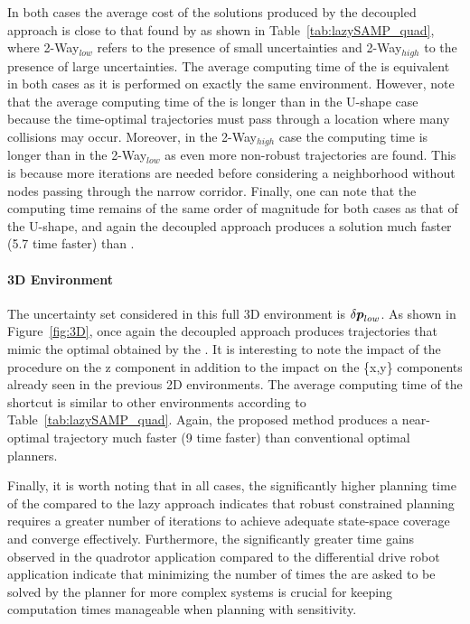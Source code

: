 In both cases the average cost of the solutions produced by the decoupled approach is close to that found by  as shown in Table~\ref{tab:lazySAMP_quad}, where 2-Way$_{low}$ refers to the presence of small uncertainties and 2-Way$_{high}$ to the presence of large uncertainties.
The average computing time of the  is equivalent in both cases as it is performed on exactly the same environment.
However, note that the average computing time of the  is longer than in the U-shape case because the time-optimal trajectories must pass through a location where many collisions may occur. 
Moreover, in the 2-Way$_{high}$ case the  computing time is longer than in the 2-Way$_{low}$ as even more non-robust trajectories are found.
This is because more iterations are needed before considering a neighborhood without nodes passing through the narrow corridor.
Finally, one can note that the  computing time remains of the same order of magnitude for both cases as that of the U-shape, and again the decoupled approach produces a solution much faster (5.7 time faster) than .

\paragraph{3D Environment} 

The uncertainty set considered in this full 3D environment is $\delta\boldsymbol{p}_{low}$.
As shown in Figure~\ref{fig:3D}, once again the decoupled approach produces trajectories that mimic the optimal obtained by the .
It is interesting to note the impact of the  procedure on the z component in addition to the impact on the \{x,y\} components already seen in the previous 2D environments.
The average computing time of the shortcut is similar to other environments according to Table~\ref{tab:lazySAMP_quad}.
Again, the proposed method produces a near-optimal trajectory much faster (9 time faster) than conventional optimal planners.

Finally, it is worth noting that in all cases, the significantly higher planning time of the  compared to the lazy approach indicates that robust constrained planning requires a greater number of iterations to achieve adequate state-space coverage and converge effectively.
Furthermore, the significantly greater time gains observed in the quadrotor application compared to the differential drive robot application indicate that minimizing the number of times the  are asked to be solved by the planner for more complex systems is crucial for keeping computation times manageable when planning with sensitivity.

